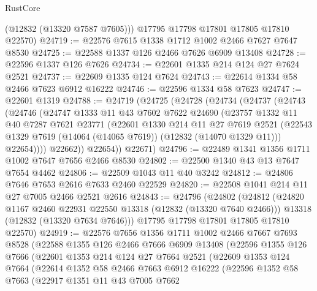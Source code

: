 \begin{lexlean}{RustCore}
\begin{coremodule}
        (@12832 (@13320 @7587 @7605)))
      @17795
      @17798
      @17801
      @17805
      @17810
      @22570)
@24719 := @22576 @7615 @1338 @1712 @1002 @2466 @7627 @7647 @8530
@24725 := @22588 @1337 @126 @2466 @7626 @6909 @13408
@24728 := @22596 @1337 @126 @7626
@24734 := @22601 @1335 @214 @124 @27 @7624 @2521
@24737 := @22609 @1335 @124 @7624
@24743 := @22614 @1334 @58 @2466 @7623 @6912 @16222
@24746 := @22596 @1334 @58 @7623
@24747 := @22601 @1319
@24788 := @24719
    (@24725
      (@24728
        (@24734
          (@24737
            (@24743
              (@24746
                (@24747
                  @1333
                  @11
                  @43
                  @7602
                  @7622
                  @24690
                  (@23757
                    @1332
                    @11
                    @40
                    @7287
                    @7621
                    @23771
                    (@22601
                      @1330
                      @214
                      @11
                      @27
                      @7619
                      @2521
                      (@22543 @1329 @7619 (@14064 (@14065 @7619)) (@12832 (@14070 @1329 @11)))
                      @22654))))
              @22662))
          @22654))
      @22671)
@24796 := @22489 @1341 @1356 @1711 @1002 @7647 @7656 @2466 @8530
@24802 := @22500 @1340 @43 @13 @7647 @7654 @4462
@24806 := @22509 @1043 @11 @40 @3242
@24812 := @24806 @7646 @7653 @2616 @7633 @2460 @22529
@24820 := @22508 @1041 @214 @11 @27 @7005 @2466 @2521 @2616
@24843 := @24796
    (@24802
      (@24812
        (@24820 @1167 @2460 @22931 @22550 @13318 (@12832 (@13320 @7640 @2466)))
        @13318
        (@12832 (@13320 @7634 @7646)))
      @17795
      @17798
      @17801
      @17805
      @17810
      @22570)
@24919 := @22576
    @7656
    @1356
    @1711
    @1002
    @2466
    @7667
    @7693
    @8528
    (@22588
      @1355
      @126
      @2466
      @7666
      @6909
      @13408
      (@22596
        @1355
        @126
        @7666
        (@22601
          @1353
          @214
          @124
          @27
          @7664
          @2521
          (@22609
            @1353
            @124
            @7664
            (@22614
              @1352
              @58
              @2466
              @7663
              @6912
              @16222
              (@22596
                @1352
                @58
                @7663
                (@22917
                  @1351
                  @11
                  @43
                  @7005
                  @7662

\end{coremodule}
\end{lexlean}
